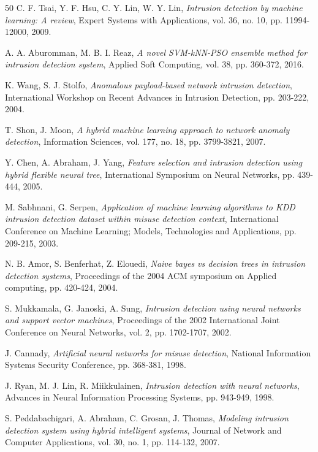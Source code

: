 \begin{thebibliography}{50}
C. F. Tsai, Y. F. Hsu, C. Y. Lin, W. Y. Lin, 
\textit{Intrusion detection by machine learning: A review}, 
Expert Systems with Applications, vol. 36, no. 10, pp. 11994-12000, 2009.

A. A. Aburomman, M. B. I. Reaz, 
\textit{A novel SVM-kNN-PSO ensemble method for intrusion detection system}, 
Applied Soft Computing, vol. 38, pp. 360-372, 2016.

K. Wang, S. J. Stolfo, 
\textit{Anomalous payload-based network intrusion detection}, 
International Workshop on Recent Advances in Intrusion Detection, pp. 203-222, 2004.

T. Shon, J. Moon, 
\textit{A hybrid machine learning approach to network anomaly detection}, 
Information Sciences, vol. 177, no. 18, pp. 3799-3821, 2007.

Y. Chen, A. Abraham, J. Yang, 
\textit{Feature selection and intrusion detection using hybrid flexible neural tree}, 
International Symposium on Neural Networks, pp. 439-444, 2005.

M. Sabhnani, G. Serpen, 
\textit{Application of machine learning algorithms to KDD intrusion detection dataset within misuse detection context}, 
International Conference on Machine Learning; Models, Technologies and Applications, pp. 209-215, 2003.

N. B. Amor, S. Benferhat, Z. Elouedi, 
\textit{Naive bayes vs decision trees in intrusion detection systems}, 
Proceedings of the 2004 ACM symposium on Applied computing, pp. 420-424, 2004.

S. Mukkamala, G. Janoski, A. Sung, 
\textit{Intrusion detection using neural networks and support vector machines}, 
Proceedings of the 2002 International Joint Conference on Neural Networks, vol. 2, pp. 1702-1707, 2002.

J. Cannady, 
\textit{Artificial neural networks for misuse detection}, 
National Information Systems Security Conference, pp. 368-381, 1998.

J. Ryan, M. J. Lin, R. Miikkulainen, 
\textit{Intrusion detection with neural networks}, 
Advances in Neural Information Processing Systems, pp. 943-949, 1998.

S. Peddabachigari, A. Abraham, C. Grosan, J. Thomas, 
\textit{Modeling intrusion detection system using hybrid intelligent systems}, 
Journal of Network and Computer Applications, vol. 30, no. 1, pp. 114-132, 2007.


\end{thebibliography}
